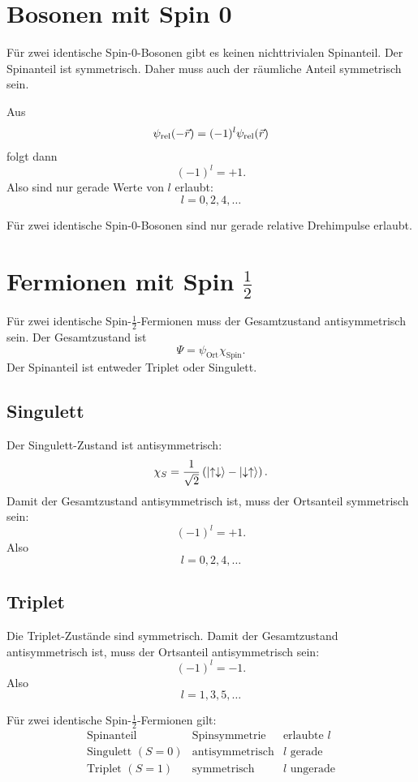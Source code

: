 \section{Bosonen mit Spin 0}

Für zwei identische Spin-0-Bosonen gibt es keinen nichttrivialen Spinanteil. Der Spinanteil ist symmetrisch. Daher muss auch der räumliche Anteil symmetrisch sein.

Aus
\[
    \psi_{\text{rel}}(-\vec r)=(-1)^l\psi_{\text{rel}}(\vec r)
\]
folgt dann
\[
    (-1)^l=+1.
\]
Also sind nur gerade Werte von \(l\) erlaubt:
\[
    l=0,2,4,\dots
\]

\begin{answerbox}
Für zwei identische Spin-0-Bosonen sind nur gerade relative Drehimpulse erlaubt.
\end{answerbox}

\section{Fermionen mit Spin \texorpdfstring{\(\frac12\)}{1/2}}

Für zwei identische Spin-\(\frac12\)-Fermionen muss der Gesamtzustand antisymmetrisch sein. Der Gesamtzustand ist
\[
    \Psi=\psi_{\text{Ort}}\chi_{\text{Spin}}.
\]
Der Spinanteil ist entweder Triplet oder Singulett.

\subsection{Singulett}

Der Singulett-Zustand ist antisymmetrisch:
\[
    \chi_S=\frac{1}{\sqrt2}
    \left(\left|\uparrow\downarrow\right\rangle-\left|\downarrow\uparrow\right\rangle\right).
\]
Damit der Gesamtzustand antisymmetrisch ist, muss der Ortsanteil symmetrisch sein:
\[
    (-1)^l=+1.
\]
Also
\[
    l=0,2,4,\dots
\]

\subsection{Triplet}

Die Triplet-Zustände sind symmetrisch. Damit der Gesamtzustand antisymmetrisch ist, muss der Ortsanteil antisymmetrisch sein:
\[
    (-1)^l=-1.
\]
Also
\[
    l=1,3,5,\dots
\]

\begin{formulabox}
Für zwei identische Spin-\(\frac12\)-Fermionen gilt:
\[
\begin{array}{c|c|c}
\text{Spinanteil} & \text{Spinsymmetrie} & \text{erlaubte }l\\
\hline
\text{Singulett }(S=0) & \text{antisymmetrisch} & l\text{ gerade}\\
\text{Triplet }(S=1) & \text{symmetrisch} & l\text{ ungerade}
\end{array}
\]
\end{formulabox}

